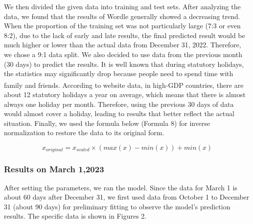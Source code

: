 \documentclass{mcmthesis}  %
\newcommand{\upcite}[1]{\textsuperscript{\cite{#1}}}
\begin{document}
We then divided the given data into training and test sets. After analyzing the data, 
we found that the results of Wordle generally showed a decreasing trend. When the proportion of 
the training set was not particularly large (7:3 or even 8:2), due to the lack of early and late 
results, the final predicted result would be much higher or lower than the actual data from 
December 31, 2022. Therefore, we chose a 9:1 data split. We also decided to use data from the 
previous month (30 days) to predict the results. It is well known that during statutory holidays, 
the statistics may significantly drop because people need to spend time with family and friends. 
According to website data\upcite{1}, in high-GDP countries, there are about 12 statutory 
holidays a year on average, which means that there is almost always one holiday per month. Therefore, 
using the previous 30 days of data would almost cover a holiday, leading to results that better 
reflect the actual situation. Finally, we used the formula below (Formula 8) for inverse normalization 
to restore the data to its original form.

\begin{equation} 
        x_{original} =x_{scaled}\times (max(x)-min(x))+min(x)
\end{equation}  

\subsubsection{Results on March 1,2023}
After setting the parameters, we ran the model. Since the data for March 1 is about 60 days after December 31, 
we first used data from October 1 to December 31 (about 90 days) for preliminary fitting to observe the model's 
prediction results. The specific data is shown in Figures 2. 
\end{document}
